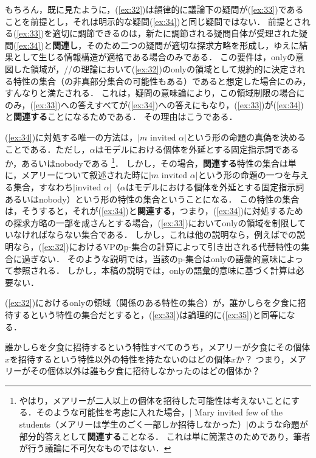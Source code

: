 \documentclass{goken}
\newcommand{\ori}[1]{\noindent\textcolor[gray]{0.7}{\fontsize{8pt}{8pt}\selectfont{\textsf{(p.~#1)}}} }
\begin{document}
\noindent
もちろん，既に見たように，(\ref{ex:32})は韻律的に議論下の疑問が(\ref{ex:33})であることを前提とし，それは明示的な疑問(\ref{ex:34})と同じ疑問ではない．
\ori{40}
前提とされる(\ref{ex:33})を適切に調節できるのは，新たに調節される疑問自体が受理された疑問(\ref{ex:34})と\textbf{関連し}，そのため二つの疑問が適切な探求方略を形成し，ゆえに結果として生じる情報構造が適格である場合のみである．
この要件は，onlyの意図した領域が，\citet{Rooth1985}/\citet{vonStechow1991}/\citet{Krifka1992}の理論において(\ref{ex:32})のonlyの領域として規約的に決定される特性の集合（の非真部分集合の可能性もある）であると想定した場合にのみ，すんなりと満たされる．
これは，疑問の意味論により，この領域制限の場合にのみ，(\ref{ex:33})への答えすべてが(\ref{ex:34})への答えにもなり，(\ref{ex:33})が(\ref{ex:34})と\textbf{関連する}ことになるためである．
その理由はこうである．

(\ref{ex:34})に対処する唯一の方法は，$| m \text{ invited } \alpha |$という形の命題の真偽を決めることである．ただし，$\alpha$はモデルにおける個体を外延とする固定指示詞であるか，あるいはnobodyである
\footnote{%
やはり，メアリーが二人以上の個体を招待した可能性は考えないことにする．そのような可能性を考慮に入れた場合，$|$ Mary invited few of the students（メアリーは学生のごく一部しか招待しなかった）$|$のような命題が部分的答えとして\textbf{関連する}ことなる．
  これは単に簡潔さのためであり，筆者が行う議論に不可欠なものではない．
}．
しかし，その場合，\textbf{関連する}特性の集合は単に，メアリーについて叙述された時に$| m \text{ invited } \alpha |$という形の命題の一つを与える集合，すなわち$| \text{invited } \alpha |$（$\alpha$はモデルにおける個体を外延とする固定指示詞あるいはnobody）という形の特性の集合ということになる．
この特性の集合は，そうすると，それが(\ref{ex:34})と\textbf{関連する}，つまり，(\ref{ex:34})に対処するための探求方略の一部を成さんとする場合，(\ref{ex:33})においてonlyの領域を制限していなければならない集合である．
しかし，これは他の説明なら，例えば\citealt{Rooth1985}での説明なら，(\ref{ex:32})におけるVPのp-集合の計算によって引き出される代替特性の集合に過ぎない．
そのような説明では，当該のp-集合はonlyの語彙的意味によって参照される．
しかし，本稿の説明では，onlyの語彙的意味に基づく計算は必要ない．

(\ref{ex:32})におけるonlyの領域（関係のある特性の集合）が，誰かしらを夕食に招待するという特性の集合だとすると，(\ref{ex:33})は論理的に(\ref{ex:35})と同等になる．

\setcounter{exx}{34}
\begin{exe}
	\ex\label{ex:35} 誰かしらを夕食に招待するという特性すべてのうち，メアリーが夕食にその個体$x$を招待するという特性以外の特性を持たないのはどの個体$x$か？
  つまり，メアリーがその個体以外は誰も夕食に招待しなかったのはどの個体か？
\end{exe}
\end{document}
